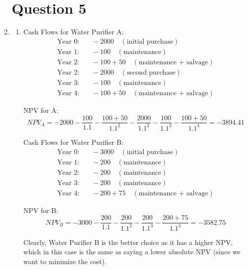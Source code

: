 \documentclass[a4paper]{article}
\begin{document}
\begin{enumerate}
    \section*{Question 5}
    \item \begin{enumerate}
        \item Cash Flows for Water Purifier A:
        \begin{align*}
            \text{Year 0:} & \quad -2000 \quad (\text{initial purchase}) \\
            \text{Year 1:} & \quad -100 \quad (\text{maintenance}) \\
            \text{Year 2:} & \quad -100 + 50 \quad (\text{maintenance + salvage}) \\
            \text{Year 2:} & \quad -2000 \quad (\text{second purchase}) \\
            \text{Year 3:} & \quad -100 \quad (\text{maintenance}) \\
            \text{Year 4:} & \quad -100 + 50 \quad (\text{maintenance + salvage})
        \end{align*}
        
        NPV for A:
        \[
        NPV_A = -2000 - \frac{100}{1.1} - \frac{100 + 50}{1.1^2} - \frac{2000}{1.1^2} - \frac{100}{1.1^3} - \frac{100 + 50}{1.1^4} = -3894.41
        \]
        
        \vspace{5mm}
        Cash Flows for Water Purifier B:
        \begin{align*}
            \text{Year 0:} & \quad -3000 \quad (\text{initial purchase}) \\
            \text{Year 1:} & \quad -200 \quad (\text{maintenance}) \\
            \text{Year 2:} & \quad -200 \quad (\text{maintenance}) \\
            \text{Year 3:} & \quad -200 \quad (\text{maintenance}) \\
            \text{Year 4:} & \quad -200 + 75 \quad (\text{maintenance + salvage})
        \end{align*}
        
        NPV for B:
        \[
        NPV_B = -3000 - \frac{200}{1.1} - \frac{200}{1.1^2} - \frac{200}{1.1^3} - \frac{200 + 75}{1.1^4} = -3582.75
        \]

        Clearly, Water Purifier B is the better choice as it has a higher NPV, which in this case is the same as saying a lower absolute NPV (since we want to minimize the cost).



\end{enumerate}
\end{enumerate}
\end{document}
